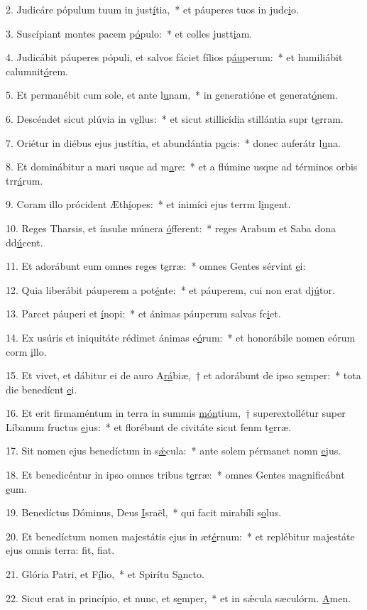 2. Judicáre pópulum tuum in just\uline{í}tia,~* et páuperes tuos in judc\uline{i}o.\par 
3. Suscípiant montes pacem p\uline{ó}pulo:~* et colles justt\uline{i}am.\par 
4. Judicábit páuperes pópuli, et salvos fáciet fílios p\uline{áu}perum:~* et humiliábit calumnit\uline{ó}rem.\par 
5. Et permanébit cum sole, et ante l\uline{u}nam,~* in generatióne et generat\uline{ó}nem.\par 
6. Descéndet sicut plúvia in v\uline{e}llus:~* et sicut stillicídia stillántia supr t\uline{e}rram.\par 
7. Oriétur in diébus ejus justítia, et abundántia p\uline{a}cis:~* donec auferátr l\uline{u}na.\par 
8. Et dominábitur a mari usque ad m\uline{a}re:~* et a flúmine usque ad términos orbis trr\uline{á}rum.\par 
9. Coram illo prócident Æth\uline{í}opes:~* et inimíci ejus terrm l\uline{i}ngent.\par 
10. Reges Tharsis, et ínsulæ múnera \uline{ó}fferent:~* reges Arabum et Saba dona dd\uline{ú}cent.\par 
11. Et adorábunt eum omnes reges t\uline{e}rræ:~* omnes Gentes sérvint \uline{e}i:\par 
12. Quia liberábit páuperem a pot\uline{é}nte:~* et páuperem, cui non erat dj\uline{ú}tor.\par 
13. Parcet páuperi et \uline{í}nopi:~* et ánimas páuperum salvas fc\uline{i}et.\par 
14. Ex usúris et iniquitáte rédimet ánimas e\uline{ó}rum:~* et honorábile nomen eórum corm \uline{i}llo.\par 
15. Et vivet, et dábitur ei de auro A\uline{rá}biæ,~† et adorábunt de ipso s\uline{e}mper:~* tota die benedícnt \uline{e}i.\par 
16. Et erit firmaméntum in terra in summis \uline{món}tium,~† superextollétur super Líbanum fructus \uline{e}jus:~* et florébunt de civitáte sicut fenm t\uline{e}rræ.\par 
17. Sit nomen ejus benedíctum in s\uline{ǽ}cula:~* ante solem pérmanet nomn \uline{e}jus.\par 
18. Et benedicéntur in ipso omnes tribus t\uline{e}rræ:~* omnes Gentes magnificábnt \uline{e}um.\par 
19. Benedíctus Dóminus, Deus \uline{I}sraël,~* qui facit mirabíli s\uline{o}lus.\par 
20. Et benedíctum nomen majestátis ejus in æt\uline{é}rnum:~* et replébitur majestáte ejus omnis terra: fit, f\uline{i}at.\par 
21. Glória Patri, et F\uline{í}lio,~* et Spirítu S\uline{a}ncto.\par 
22. Sicut erat in princípio, et nunc, et s\uline{e}mper,~* et in sǽcula sæculórm. \uline{A}men.\par 
